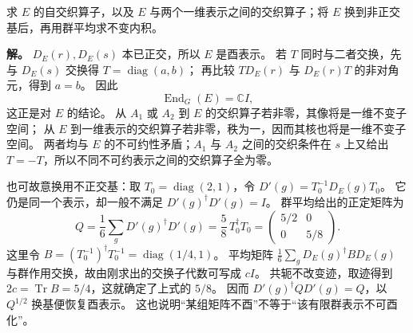 \begin{workedexample}
\label{ex:d3-comprehensive-schur}
求 $E$ 的自交织算子，以及 $E$ 与两个一维表示之间的交织算子；将 $E$ 换到非正交基后，再用群平均求不变内积。

\textbf{解。} $D_E(r),D_E(s)$ 本已正交，所以 $E$ 是酉表示。
若 $T$ 同时与二者交换，先与 $D_E(s)$ 交换得 $T=\operatorname{diag}(a,b)$；
再比较 $TD_E(r)$ 与 $D_E(r)T$ 的非对角元，得到 $a=b$。
因此
\[
\operatorname{End}_G(E)=\mathbb C I,
\]
这正是对 $E$ 的结论。
从 $A_1$ 或 $A_2$ 到 $E$ 的交织算子若非零，其像将是一维不变子空间；
从 $E$ 到一维表示的交织算子若非零，秩为一，因而其核也将是一维不变子空间。
两者均与 $E$ 的不可约性矛盾；$A_1$ 与 $A_2$ 之间的交织条件在 $s$ 上又给出 $T=-T$，所以不同不可约表示之间的交织算子全为零。

也可故意换用不正交基：取 $T_0=\operatorname{diag}(2,1)$，令
$D'(g)=T_0^{-1}D_E(g)T_0$。
它仍是同一个表示，却一般不满足 $D'(g)^\dagger D'(g)=I$。
群平均给出的正定矩阵为
\[
Q=\frac16\sum_g D'(g)^\dagger D'(g)
=\frac58\,T_0^\dagger T_0
=\begin{pmatrix}5/2&0\\0&5/8\end{pmatrix}.
\]
这里令 $B=(T_0^{-1})^\dagger T_0^{-1}=\operatorname{diag}(1/4,1)$。
平均矩阵 $\frac16\sum_gD_E(g)^\dagger B D_E(g)$ 与群作用交换，故由刚求出的交换子代数可写成 $cI$。
共轭不改变迹，取迹得到 $2c=\operatorname{Tr}B=5/4$，这就确定了上式的 $5/8$。
因而 $D'(g)^\dagger QD'(g)=Q$，以 $Q^{1/2}$ 换基便恢复酉表示。
这也说明“某组矩阵不酉”不等于“该有限群表示不可酉化”。
\end{workedexample}

